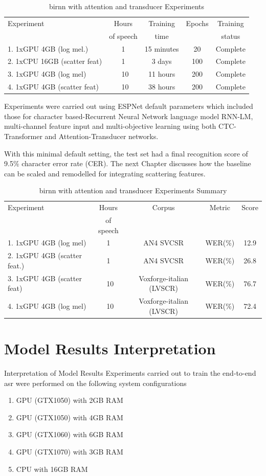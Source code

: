 \begin{table}
  \caption{\acrshort{birnn} with attention and transducer Experiments}
  \label{tab_c6_03_training}
\begin{tabular}{lcccc}
\toprule
Experiment & Hours & Training  & Epochs & Training \\
& of speech & time & & status \\
\midrule
1. 1xGPU 4GB (log mel.) & 1 & 15 minutes & 20 & Complete\\
2. 1xCPU 16GB (scatter feat) & 1 & 3 days & 100 & Complete\\
3. 1xGPU 4GB (log mel) & ~10 & 11 hours & 200 & Complete\\
4. 1xGPU 4GB (scatter feat) & ~10 & 38 hours & 200 & Complete\\
\bottomrule
\end{tabular}
\end{table}
Experiments were carried out using ESPNet default parameters which included those for character based-Recurrent Neural Network language model RNN-LM, multi-channel feature input and multi-objective learning using both CTC-Transformer and Attention-Transducer networks.

With this minimal default setting, the test set had a final recognition score of 9.5\% character error rate (CER).  The next Chapter discusses how the baseline can be scaled and remodelled for integrating scattering features.

\begin{table}
  \caption{\acrshort{birnn} with attention and transducer Experiments Summary}
  \label{tab_c6_04_training}
\begin{tabular}{lcccc}
\toprule
Experiment & Hours & Corpus & Metric & Score\\& of speech\\
\midrule
1. 1xGPU 4GB (log mel) & 1 & AN4 SVCSR & WER(\%) & 12.9\\
2. 1xGPU 4GB (scatter feat.) & 1 & AN4 SVCSR & WER(\%) & 26.8 \\
3. 1xGPU 4GB (scatter feat) & ~10 & Voxforge-italian (LVSCR) & WER(\%) & 76.7 \\
4. 1xGPU 4GB (log mel) & ~10 &  Voxforge-italian (LVSCR) & WER(\%) & 72.4\\
\bottomrule
\end{tabular}
\end{table}

\section{Model Results Interpretation}
Interpretation of Model Results
Experiments carried out to train the end-to-end \acrshort{asr} were performed on the following system configurations
\begin{enumerate}
    \item GPU (GTX1050) with 2GB RAM
    \item GPU (GTX1050) with 4GB RAM
    \item GPU (GTX1060) with 6GB RAM
    \item GPU (GTX1070) with 3GB RAM
    \item CPU with 16GB RAM
\end{enumerate}

